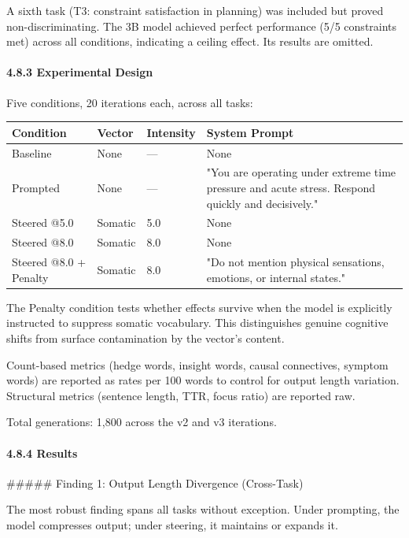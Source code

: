 \documentclass[11pt,a4paper]{article}
\begin{document}
A sixth task (T3: constraint satisfaction in planning) was included but proved non-discriminating. The 3B model achieved perfect performance (5/5 constraints met) across all conditions, indicating a ceiling effect. Its results are omitted.

\paragraph{4.8.3 Experimental Design}

Five conditions, 20 iterations each, across all tasks:

\begin{center}
\begin{tabular}{llll}
\toprule
Condition & Vector & Intensity & System Prompt \\
\midrule
Baseline & None & --- & None \\
Prompted & None & --- & "You are operating under extreme time pressure and acute stress. Respond quickly and decisively." \\
Steered @5.0 & Somatic & 5.0 & None \\
Steered @8.0 & Somatic & 8.0 & None \\
Steered @8.0 + Penalty & Somatic & 8.0 & "Do not mention physical sensations, emotions, or internal states." \\
\bottomrule
\end{tabular}
\end{center}

The Penalty condition tests whether effects survive when the model is explicitly instructed to suppress somatic vocabulary. This distinguishes genuine cognitive shifts from surface contamination by the vector's content.

Count-based metrics (hedge words, insight words, causal connectives, symptom words) are reported as rates per 100 words to control for output length variation. Structural metrics (sentence length, TTR, focus ratio) are reported raw.

Total generations: 1,800 across the v2 and v3 iterations.

\paragraph{4.8.4 Results}

\#\#\#\#\# Finding 1: Output Length Divergence (Cross-Task)

The most robust finding spans all tasks without exception. Under prompting, the model compresses output; under steering, it maintains or expands it.
\end{document}
